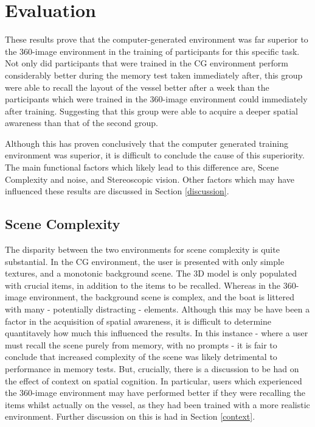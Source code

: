 \documentclass[ %
                    author={Elis Jones},
                supervisor={Dr. Kirsten Cater},
                    degree={BSc},
                     title={The Effect of Presentation Medium on Spatial Cognition},
                  subtitle={in the Virtual Environment},
                      year={2018} ]{dissertation}
\begin{document}
\section{Evaluation}
These results prove that the computer-generated environment was far superior to the 360-image environment in the training of participants for this specific task. Not only did participants that were trained in the CG environment perform considerably better during the memory test taken immediately after, this group were able to recall the layout of the vessel better after a week than the participants which were trained in the 360-image environment could immediately after training. Suggesting that this group were able to acquire a deeper spatial awareness than that of the second group. 

Although this has proven conclusively that the computer generated training environment was superior, it is difficult to conclude the cause of this superiority. The main functional factors which likely lead to this difference are, Scene Complexity and noise, and Stereoscopic vision. Other factors which may have influenced these results are discussed in Section \ref{discussion}.

\subsection{Scene Complexity}

The disparity between the two environments for scene complexity is quite substantial. In the CG environment, the user is presented with only simple textures, and a monotonic background scene. The 3D model is only populated with crucial items, in addition to the items to be recalled. Whereas in the 360-image environment, the background scene is complex, and the boat is littered with many - potentially distracting - elements. Although this may be have been a factor in the acquisition of spatial awareness, it is difficult to determine quantitavely how much this influenced the results. In this instance - where a user must recall the scene purely from memory, with no prompts - it is fair to conclude that increased complexity of the scene was likely detrimental to performance in memory tests. But, crucially, there is a discussion to be had on the effect of context on spatial cognition. In particular, users which experienced the 360-image environment may have performed better if they were recalling the items whilst actually on the vessel, as they had been trained with a more realistic environment. Further discussion on this is had in Section \ref{context}.
\end{document}
